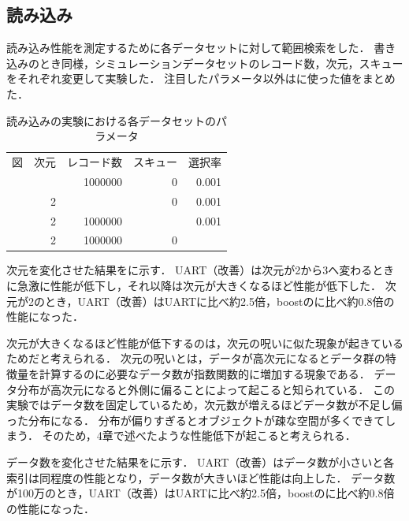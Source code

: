 \subsection{読み込み}

読み込み性能を測定するために各データセットに対して範囲検索をした．
書き込みのとき同様，シミュレーションデータセットのレコード数，次元，スキューをそれぞれ変更して実験した．
注目したパラメータ以外は\Tab{\ref{tab:scan}}に使った値をまとめた．
\begin{table}[tb]
  \caption{読み込みの実験における各データセットのパラメータ}
  \label{tab:scan}
  \centering \small
  \begin{tabular}{lrrrr}
    \toprule
    図                               & 次元 & レコード数 & スキュー & 選択率 \\
    \cmidrule(lr){1-1}
    \cmidrule(lr){2-2}
    \cmidrule(lr){3-3}
    \cmidrule(lr){4-4}
    \cmidrule(lr){5-5}
    \Fig{\ref{graph:dim-sc}}         & \-   & 1000000    & 0        & 0.001  \\
    \Fig{\ref{graph:rec-sc}}         & 2    & \-         & 0        & 0.001  \\
    \Fig{\ref{graph:skew-sc}}        & 2    & 1000000    & \-       & 0.001  \\
    \Fig{\ref{graph:selectivity-sc}} & 2    & 1000000    & 0        & \-     \\
    \bottomrule
  \end{tabular}
\end{table}

次元を変化させた結果を\Fig{\ref{graph:dim-sc}}に示す．
UART（改善）は次元が2から3へ変わるときに急激に性能が低下し，それ以降は次元が大きくなるほど性能が低下した．
次元が2のとき，UART（改善）はUARTに比べ約2.5倍，boostの\RTree に比べ約0.8倍の性能になった．


次元が大きくなるほど性能が低下するのは，次元の呪いに似た現象が起きているためだと考えられる．
次元の呪いとは，データが高次元になるとデータ群の特徴量を計算するのに必要なデータ数が指数関数的に増加する現象である．
データ分布が高次元になると外側に偏ることによって起こると知られている．
この実験ではデータ数を固定しているため，次元数が増えるほどデータ数が不足し偏った分布になる．
分布が偏りすぎるとオブジェクトが疎な空間が多くできてしまう．
そのため，4章で述べたような性能低下が起こると考えられる．

データ数を変化させた結果を\Fig{\ref{graph:rec-sc}}に示す．
UART（改善）はデータ数が小さいと各索引は同程度の性能となり，データ数が大きいほど性能は向上した．
データ数が100万のとき，UART（改善）はUARTに比べ約2.5倍，boostの\RTree に比べ約0.8倍の性能になった．



